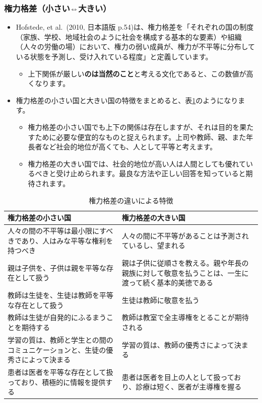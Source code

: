 \documentclass[
]{book}
\providecommand{\tightlist}{%
  \setlength{\itemsep}{0pt}\setlength{\parskip}{0pt}}
\begin{document}
\hypertarget{ux6a29ux529bux683cux5deeux5c0fux3055ux3044ux5927ux304dux3044}{%
\subsubsection{権力格差（小さい⇔大きい）}\label{ux6a29ux529bux683cux5deeux5c0fux3055ux3044ux5927ux304dux3044}}

\begin{itemize}
\item
  Hofstede, et al.~(2010, 日本語版 p.54)は、権力格差を「それぞれの国の制度（家族、学校、地域社会のように社会を構成する基本的な要素）や組織（人々の労働の場）において、権力の弱い成員が、権力が不平等に分布している状態を予測し、受け入れている程度」と定義しています。

  \begin{itemize}
  \tightlist
  \item
    上下関係が厳しい\textbf{のは当然のこと}と考える文化であると、この数値が高くなります。
  \end{itemize}
\item
  権力格差の小さい国と大きい国の特徴をまとめると、表\ref{tab:PDI0}のようになります。

  \begin{itemize}
  \item
    権力格差の小さい国でも上下の関係は存在しますが、それは目的を果たすために必要な便宜的なものと捉えられます。上司や教師、親、また年長者など社会的地位が高くても、人として平等と考えます。
  \item
    権力格差の大きい国では、社会的地位が高い人は人間としても優れているべきと受け止められます。最良な方法や正しい回答を知っていると期待されます。
  \end{itemize}
\end{itemize}

\begin{table}

\caption{\label{tab:PDI0}権力格差の違いによる特徴}
\centering
\begin{tabular}[t]{l|l}
\hline
権力格差の小さい国 & 権力格差の大きい国\\
\hline
人々の間の不平等は最小限にすべきであり、人はみな平等な権利を持つべき & 人々の間に不平等があることは予測されているし、望まれる\\
\hline
親は子供を、子供は親を平等な存在として扱う & 親は子供に従順さを教える。親や年長の親族に対して敬意を払うことは、一生に渡って続く基本的美徳である\\
\hline
教師は生徒を、生徒は教師を平等な存在として扱う & 生徒は教師に敬意を払う\\
\hline
教師は生徒が自発的にふるまうことを期待する & 教師は教室で全主導権をとることが期待される\\
\hline
学習の質は、教師と学生との間のコミュニケーションと、生徒の優秀さによって決まる & 学習の質は、教師の優秀さによって決まる\\
\hline
患者は医者を平等な存在として扱っており、積極的に情報を提供する & 患者は医者を目上の人として扱っており、診療は短く、医者が主導権を握る\\
\hline
\end{tabular}
\end{table}
\end{document}
